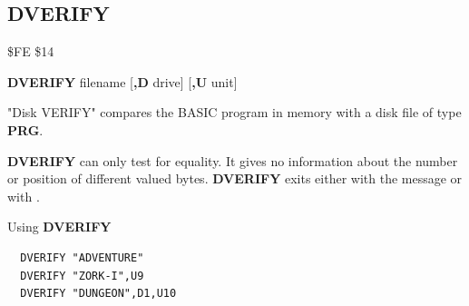 
\newpage
\subsection{DVERIFY}
\begin{description}[leftmargin=2cm,style=nextline]
\item [Token:] \$FE \$14
\item [Format:] {\bf DVERIFY} filename [{\bf,D} drive] [{\bf,U} unit]
\item [Usage:]
   "Disk VERIFY" compares the BASIC program
   in memory with a disk file of type {\bf PRG}.

   \filenamedefinition

   \drivedefinition

   \unitdefinition

\item [Remarks:]
   {\bf DVERIFY} can only test for equality. It gives no information
   about the number or position of different valued bytes.
    {\bf DVERIFY} exits either with the message 
    or with .

\item [Example:] Using {\bf DVERIFY}
\begin{tcolorbox}[colback=black,coltext=white]
\verbatimfont{\codefont}
\begin{verbatim}
  DVERIFY "ADVENTURE"
  DVERIFY "ZORK-I",U9
  DVERIFY "DUNGEON",D1,U10
\end{verbatim}
\end{tcolorbox}
\end{description}


\newpage
